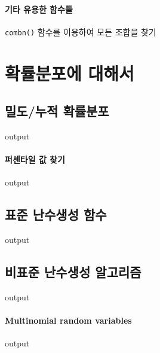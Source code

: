 \documentclass[../tutorial.tex]{subfiles}
\begin{document}
\paragraph{기타 유용한 함수들}
\texttt{combn()} 함수를 이용하여 모든 조합을 찾기



\section{확률분포에 대해서}

\subsection{밀도/누적 확률분포}
\begin{Schunk}
\begin{Soutput}
output
\end{Soutput}
\end{Schunk}

\paragraph{퍼센타일 값 찾기}
\begin{Schunk}
\begin{Soutput}
output
\end{Soutput}
\end{Schunk}

\subsection{표준 난수생성 함수}
\begin{Schunk}
\begin{Soutput}
output
\end{Soutput}
\end{Schunk}

\subsection{비표준 난수생성 알고리즘}
\begin{Schunk}
\begin{Soutput}
output
\end{Soutput}
\end{Schunk}


\paragraph{Multinomial random variables}
\begin{Schunk}
\begin{Soutput}
output
\end{Soutput}
\end{Schunk}
\end{document}
